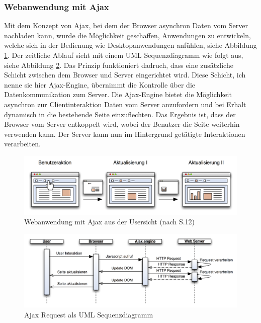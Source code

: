   \subsubsection{Webanwendung mit Ajax}
  
  Mit dem Konzept von \ac{Ajax}, bei dem der Browser asynchron Daten vom Server
  nachladen kann, wurde die Möglichkeit geschaffen, Anwendungen zu entwickeln,
  welche sich in der Bedienung wie Desktopanwendungen anfühlen, siehe Abbildung
  \ref{img:ajaxPageReload}. Der zeitliche Ablauf sieht mit einem \ac{UML}
  Sequenzdiagramm wie folgt aus, siehe Abbildung
  \ref{img:sequenzdiagrammAjaxPageReload}. Das Prinzip funktioniert dadruch,
  dass eine zusätzliche Schicht zwischen dem Browser und Server eingerichtet
  wird. Diese Schicht, ich nenne sie hier Ajax-Engine, übernimmt die Kontrolle
  über die Datenkommunikation zum Server. Die Ajax-Engine bietet die
  Möglichkeit asynchron zur Clientinteraktion Daten vom Server anzufordern und
  bei Erhalt dynamisch in die bestehende Seite einzuflechten. Das Ergebnis ist,
  dass der Browser vom Server entkoppelt wird, wobei der Benutzer die Seite
  weiterhin verwenden kann. Der Server kann nun im Hintergrund getätigte
  Interaktionen verarbeiten.
  
  \begin{figure}[hbt]
    \begin{center}
      \includegraphics[width=\textwidth]{./image/ajaxPageReload.png}
      \caption{Webanwendung mit Ajax aus der Usersicht (nach
      \cite{DiplomarbeitStephanSchuster} S.12)}
      \label{img:ajaxPageReload}
    \end{center}
  \end{figure}
  
  \begin{figure}[hbt]
    \begin{center}
      \includegraphics[width=\textwidth]{./image/sequenzdiagrammAjaxPageReload.png}
      \caption{Ajax Request als \ac{UML} Sequenzdiagramm}
      \label{img:sequenzdiagrammAjaxPageReload}
    \end{center}
  \end{figure}
  
